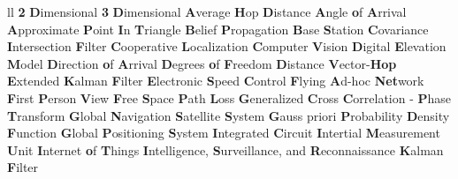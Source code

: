 \begin{abbreviations}{ll} %
    			{\textbf{2} \textbf{D}imensional}
    			{\textbf{3} \textbf{D}imensional}
    		{\textbf{A}verage \textbf{H}op \textbf{D}istance} 
    		{\textbf{A}ngle \textbf{o}f \textbf{A}rrival}
    		{\textbf{A}pproximate \textbf{P}oint \textbf{I}n \textbf{T}riangle}
    			{\textbf{B}elief \textbf{P}ropagation} 
    			{\textbf{B}ase \textbf{S}tation}
    		{\textbf{C}ovariance \textbf{I}ntersection \textbf{F}ilter}   
    		    {\textbf{C}ooperative \textbf{L}ocalization}
    		    {\textbf{C}omputer \textbf{V}ision}
    		{\textbf{D}igital \textbf{E}levation \textbf{M}odel}
    		{\textbf{D}irection \textbf{o}f \textbf{A}rrival}
    		{\textbf{D}egrees \textbf{o}f \textbf{F}reedom}
    		{\textbf{D}istance \textbf{V}ector-\textbf{Hop}}
    		{\textbf{E}xtended \textbf{K}alman \textbf{F}ilter}
    		{\textbf{E}lectronic \textbf{S}peed \textbf{C}ontrol}
    		{\textbf{F}lying \textbf{A}d-hoc \textbf{Net}work}
    		{\textbf{F}irst \textbf{P}erson \textbf{V}iew}
    		{\textbf{F}ree \textbf{S}pace \textbf{P}ath \textbf{L}oss}
    	{\textbf{G}eneralized \textbf{C}ross \textbf{C}orrelation - \textbf{P}hase \textbf{T}ransform}
    		{\textbf{G}lobal \textbf{N}avigation \textbf{S}atellite \textbf{S}ystem}
    		{\textbf{G}auss priori \textbf{P}robability \textbf{D}ensity \textbf{F}unction}
    		{\textbf{G}lobal \textbf{P}ositioning \textbf{S}ystem}
    			{\textbf{I}ntegrated  \textbf{C}ircuit}
    		{\textbf{I}ntertial \textbf{M}easurement \textbf{U}nit}
    		{\textbf{I}nternet \textbf{o}f \textbf{T}hings}
    		{\textbf{I}ntelligence, \textbf{S}urveillance, and \textbf{R}econnaissance}
    			{\textbf{K}alman \textbf{F}ilter}

\end{abbreviations}

